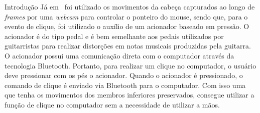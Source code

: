 \begin{chapter}{Introdução}
Já em~\cite{Antunes16} foi utilizado os movimentos da cabeça capturados ao longo
de \textit{frames} por uma \textit{webcam} para controlar o ponteiro do mouse,
sendo que, para o evento de clique, foi utilizado o auxílio de um acionador
baseado em pressão. O acionador é do tipo pedal e é bem semelhante aos pedais
utilizados por guitarristas para realizar distorções em notas musicais
produzidas pela guitarra. O acionador possui uma comunicação direta com o
computador através da tecnologia Bluetooth. Portanto, para realizar um clique no
computador, o usuário deve pressionar com os pés o acionador. Quando o acionador
é pressionado, o comando de clique é enviado via Bluetooth para o computador.
Com isso uma que tenha os movimentos dos membros inferiores preservados,
consegue utilizar a função de clique no computador sem a necessidade de utilizar
a mãos. 




\end{chapter}
